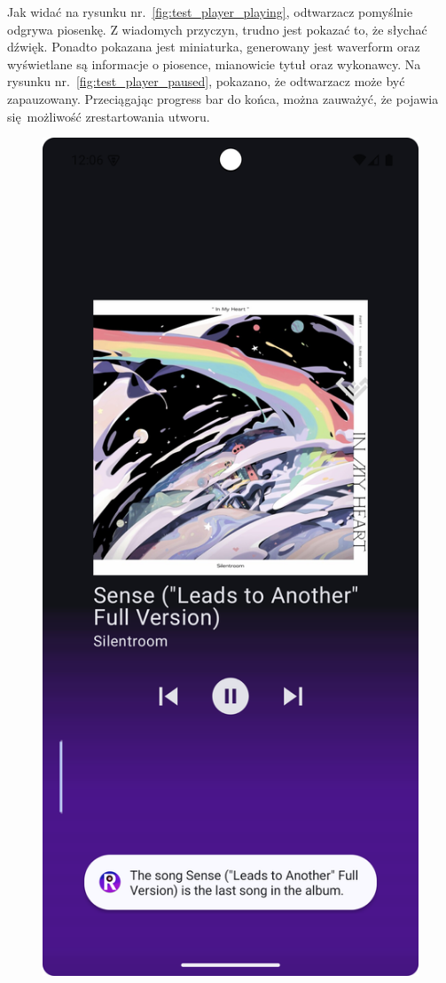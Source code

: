 Jak widać na rysunku nr.~\ref{fig:test_player_playing}, odtwarzacz pomyślnie odgrywa piosenkę. Z wiadomych przyczyn, trudno jest pokazać to, że słychać dźwięk. Ponadto pokazana jest miniaturka, generowany jest waverform oraz wyświetlane są informacje o piosence, mianowicie tytuł oraz wykonawcy. Na rysunku nr.~\ref{fig:test_player_paused}, pokazano, że odtwarzacz może być zapauzowany. Przeciągając progress bar do końca, można zauważyć, że pojawia się możliwość zrestartowania utworu.

\begin{figure}[H]
	\centering
	\includegraphics[width=1\textwidth]{images/test_player_nextcap.png}

\end{figure}
